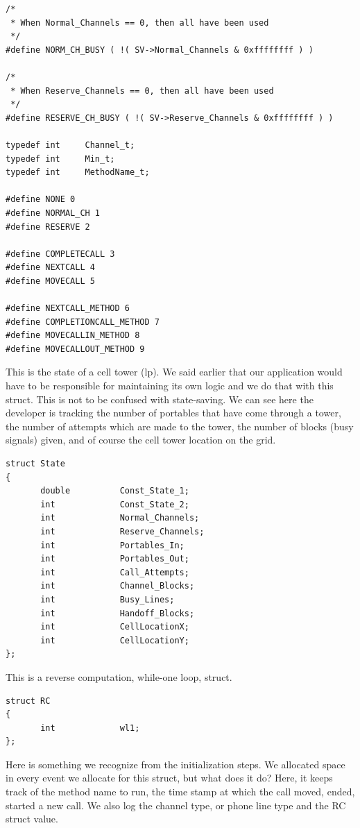 \documentclass[12pt]{article}
\begin{document}
\begin{verbatim}
/*
 * When Normal_Channels == 0, then all have been used
 */
#define NORM_CH_BUSY ( !( SV->Normal_Channels & 0xffffffff ) )

/*
 * When Reserve_Channels == 0, then all have been used
 */
#define RESERVE_CH_BUSY ( !( SV->Reserve_Channels & 0xffffffff ) )

typedef int     Channel_t;
typedef int     Min_t;
typedef int     MethodName_t;

#define NONE 0
#define NORMAL_CH 1
#define RESERVE 2

#define COMPLETECALL 3
#define NEXTCALL 4
#define MOVECALL 5

#define NEXTCALL_METHOD 6
#define COMPLETIONCALL_METHOD 7
#define MOVECALLIN_METHOD 8
#define MOVECALLOUT_METHOD 9
\end{verbatim}

This is the state of a cell tower (lp).  We said earlier that our
application would have to be responsible for maintaining its own
logic and we do that with this struct.  This is not to be confused
with state-saving.  We can see here the developer is tracking the
number of portables that have come through a tower, the number of
attempts which are made to the tower, the number of blocks (busy
signals) given, and of course the cell tower location on the grid.

\begin{verbatim}                                                                                     
struct State
{
       double          Const_State_1;
       int             Const_State_2;
       int             Normal_Channels;
       int             Reserve_Channels;
       int             Portables_In;
       int             Portables_Out;
       int             Call_Attempts;
       int             Channel_Blocks;
       int             Busy_Lines;
       int             Handoff_Blocks;
       int             CellLocationX;
       int             CellLocationY;
};
\end{verbatim}
 
This is a reverse computation, while-one loop, struct.

\begin{verbatim}
struct RC
{
       int             wl1;
};
\end{verbatim}
 
Here is something we recognize from the initialization steps.  We
allocated space in every event we allocate for this struct, but what
does it do? Here, it keeps track of the method name to run, the time
stamp at which the call moved, ended, started a new call.  We also log
the channel type, or phone line type and the RC struct value.
\end{document}
